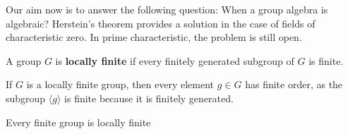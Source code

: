 %
%
%



Our aim now is to answer the following question: When
a group algebra is algebraic? Herstein's theorem provides
a solution in the case of fields of characteristic zero. In prime characteristic,
the problem is still open. 

\begin{definition}
	A group $G$ is \textbf{locally finite} if every finitely generated 
	subgroup of $G$ is finite. 
\end{definition}

If $G$ is a locally finite group, then every element $g\in G$ has finite order, as
the subgroup $\langle g\rangle$ is finite because it is finitely generated.

\begin{example}
    Every finite group is locally finite
\end{example}

